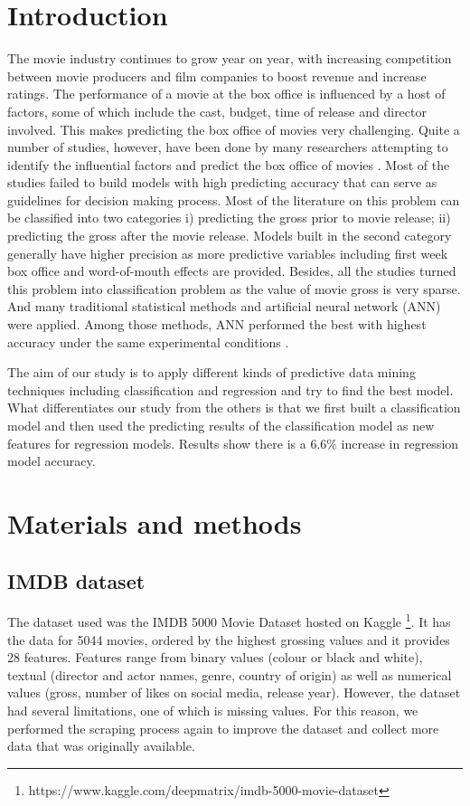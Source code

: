 \section{Introduction}
The movie industry continues to grow year on year, with increasing competition between movie producers and film companies to boost revenue and increase ratings. The performance of a movie at the box office is influenced by a host of factors, some of which include the cast, budget, time of release and director involved. This makes predicting the box office of movies very challenging. Quite a number of studies, however, have been done by many researchers attempting to identify the influential factors and predict the box office of movies \cite{sharda2006predicting}. Most of the studies failed to build models with high predicting accuracy that can serve as guidelines for decision making process. Most of the literature on this problem can be classified into two categories i) predicting the gross prior to movie release; ii) predicting the gross after the movie release. Models built in the second category generally have higher precision as more predictive variables including first week box office and word-of-mouth effects are provided. Besides, all the studies turned this problem into classification problem as the value of movie gross is very sparse.  And many traditional statistical methods and artificial neural network (ANN) were applied. Among those methods, ANN performed the best with highest accuracy under the same experimental conditions \cite{sharda2006predicting}.
 
The aim of our study is to apply different kinds of predictive data mining techniques including classification and regression and try to find the best model. What differentiates our study from the others is that we first built a classification model and then used the predicting results of the classification model as new features for regression models. Results show there is a 6.6\% increase in regression model accuracy.

\section{Materials and methods}

\subsection{IMDB dataset}
The dataset used was the IMDB 5000 Movie Dataset hosted on Kaggle \footnote{https://www.kaggle.com/deepmatrix/imdb-5000-movie-dataset}. It has the data for 5044 movies, ordered by the highest grossing values and it provides 28 features. Features range from binary values (colour or black and white), textual (director and actor names, genre, country of origin) as well as numerical values (gross, number of likes on social media, release year).  However, the dataset had several limitations, one of which is missing values. For this reason, we performed the scraping process again to improve the dataset and collect more data that was originally available.

